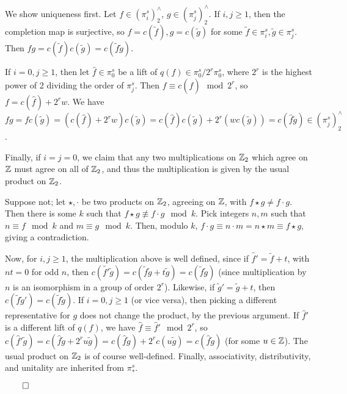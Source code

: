 \documentclass{MetricNotes2023}
\def\inte{\ensuremath\mathbb{Z}}
\def\done{\begin{flushright}\vspace{-4.35ex}\(\qed\)\end{flushright}}
\begin{document}
\begin{ourproof}
We show uniqueness first. Let \(f \in (\pi_i^s)^\wedge_2\), \(g \in (\pi_j^s)^\wedge_2\). If \(i,j \geq 1\), then the completion map is surjective, so \(f=c(\tilde f), g = c(\tilde g)\) for some \(\tilde f \in \pi_i^s, \tilde g \in \pi_j^s\). Then \(fg=c(\tilde f)c(\tilde g)=c(\tilde f \tilde g)\).

If \(i=0, j\geq 1\), then let \(\hat f\in \pi_0^s\) be a lift of \(q(f)\in \pi_0^s/2^r\pi_0^s\), where \(2^r\) is the highest power of 2 dividing the order of \(\pi_j^s\). Then \(f\equiv c(\hat f) \mod 2^r\), so \(f=c(\hat f) + 2^rw\). We have \(fg=fc(\tilde g)=(c(\hat f) + 2^r w)c(\tilde g)=c(\hat f) c(\tilde g)+2^r(wc(\tilde g))=c(\hat f \tilde g)\in (\pi_j^s)^\wedge_2\). 

Finally, if \(i=j=0\), we claim that any two multiplications on \(\inte_2\) which agree on \(\inte\) must agree on all of \(\inte_2\), and thus the multiplication is given by the usual product on \(\inte_2\). 

Suppose not; let \(\star, \cdot\) be two products on \(\inte_2\), agreeing on \(\inte\), with \(f\star g \neq f \cdot g\). Then there is some \(k\) such that \(f \star g \not\equiv f \cdot g \mod k\). Pick integers \(n, m\) such that \(n\equiv f \mod k\) and \(m \equiv g \mod k\). Then, modulo \(k\), \(f\cdot g \equiv n\cdot m =n\star m \equiv f \star g\), giving a contradiction.

Now, for \(i, j \geq 1\), the multiplication above is well defined, since if \(\tilde{f'}=\tilde f+t\), with \(nt=0\) for odd \(n\), then \(c(\tilde{f'}\tilde g)=c(\tilde f \tilde g + t\tilde g)=c(\tilde f \tilde g)\) (since multiplication by \(n\) is an isomorphism in a group of order \(2^r\)). Likewise, if \(\tilde{g}'=\tilde g + t\), then \(c(\tilde f \tilde{g}')=c(\tilde f \tilde g)\). If \(i=0, j \geq 1\)  (or vice versa), then picking a different representative for \(g\) does not change the product, by the previous argument. If \(\hat f'\) is a different lift of \(q(f)\), we have \(\hat f \equiv \hat f' \mod 2^r\), so \(c(\hat f' \tilde g)=c(\hat f\tilde g + 2^ru\tilde g)=c(\hat f \tilde g)+2^rc(u\tilde g)=c(\hat f \tilde g)\) (for some \(u \in \inte\)). The usual product on \(\inte_2\) is of course well-defined. Finally, associativity, distributivity, and unitality are inherited from \(\pi_*^s\). \done
\end{ourproof}
\end{document}
